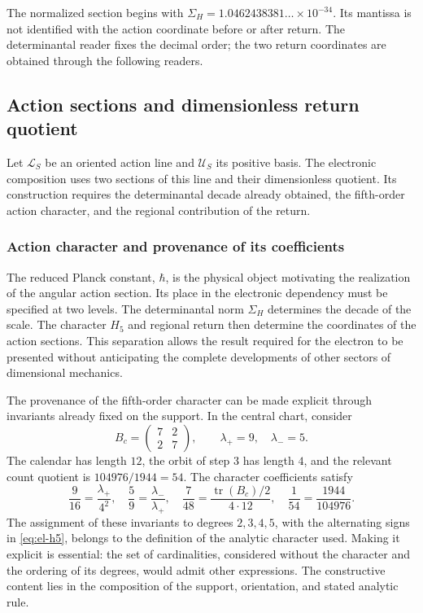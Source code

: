 The normalized section begins with
\(\Sigma_H=1.0462438381\ldots\times10^{-34}\). Its mantissa is not
identified with the action coordinate before or after return.
The determinantal reader fixes the decimal order; the two return
coordinates are obtained through the following readers.

\subsection{Action sections and dimensionless return quotient}

Let \(\mathcal L_S\) be an oriented action line and \(\mathcal U_S\)
its positive basis. The electronic composition uses two sections of
this line and their dimensionless quotient. Its construction requires
the determinantal decade already obtained, the fifth-order action character,
and the regional contribution of the return.

\subsubsection{Action character and provenance of its coefficients}
\label{sec:revision-planck}

The reduced Planck constant, \(\hbar\), is the physical object
motivating the realization of the angular action section. Its place in
the electronic dependency must be specified at two levels. The
determinantal norm \(\Sigma_H\) determines the decade of the scale. The
character \(H_5\) and regional return then determine the coordinates
of the action sections. This separation allows the result required
for the electron to be presented without anticipating the complete developments
of other sectors of dimensional mechanics.

The provenance of the fifth-order character can be made explicit through
invariants already fixed on the support. In the central chart, consider
\[
 B_c=\begin{pmatrix}7&2\\2&7\end{pmatrix},
 \qquad \lambda_+=9,\quad\lambda_-=5.
\]
The calendar has length \(12\), the orbit of step \(3\) has
length \(4\), and the relevant count quotient is
\(104976/1944=54\). The character coefficients satisfy
\begin{equation}
 \frac9{16}=\frac{\lambda_+}{4^2},\quad
 \frac59=\frac{\lambda_-}{\lambda_+},\quad
 \frac7{48}=\frac{\operatorname{tr}(B_c)/2}{4\cdot12},\quad
 \frac1{54}=\frac{1944}{104976}.
 \label{eq:revision-h5-coeficientes}
\end{equation}
The assignment of these invariants to degrees \(2,3,4,5\), with the
alternating signs in \eqref{eq:el-h5}, belongs to the definition of the
analytic character used. Making it explicit is essential: the set of
cardinalities, considered without the character and the ordering of its degrees,
would admit other expressions. The constructive content lies in the
composition of the support, orientation, and stated analytic rule.

